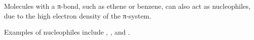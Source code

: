 		Molecules with a π-bond, such as ethene or benzene, can also act as nucleophiles, due to the high electron
		density of the π-system.

		Examples of nucleophiles include , , and .






















